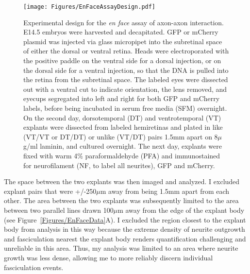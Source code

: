 \begin{figure}[hbtp]
    \begin{center}
        \texttt{[image: Figures/EnFaceAssayDesign.pdf]}
        \caption[Experimental design for the \emph{en face} assay of axon-axon interaction.]
        {Experimental design for the \emph{en face} assay of axon-axon interaction.
        E14.5 embryos were harvested and decapitated.
        GFP or mCherry plasmid was injected via glass micropipet into the subretinal space of either the dorsal or ventral retina.
        Heads were electroporated with the positive paddle on the ventral side for a dorsal injection, or on the dorsal side for a ventral injection, so that the DNA is pulled into the retina from the subretinal space.
        The labeled eyes were dissected out with a ventral cut to indicate orientation, the lens removed, and eyecups segregated into left and right for both GFP and mCherry labels, before being incubated in serum free media (SFM) overnight.
        On the second day, dorsotemporal (DT) and ventrotemporal (VT) explants were dissected from labeled hemiretinas and plated in like (VT/VT or DT/DT) or unlike (VT/DT) pairs 1.5mm apart on 8$\mu$g/ml laminin, and cultured overnight.
        The next day, explants were fixed with warm 4\% paraformaldehyde (PFA) and immunostained for neurofilament (NF, to label all neurites), GFP and mCherry.
        }
        \label{Figures/EnFaceAssayDesign}
    \end{center}
\end{figure}
The space between the two explants was then imaged and analyzed.
I excluded explant pairs that were +/-250$\mu$m away from being 1.5mm apart from each other.
The area between the two explants was subsequently limited to the area between two parallel lines drawn 100$\mu$m away from the edge of the explant body (see Figure~\ref{Figures/EnFaceData}A).
I excluded the region closest to the explant body from analysis in this way because the extreme density of neurite outgrowth and fasciculation nearest the explant body renders quantification challenging and unreliable in this area.
Thus, my analysis was limited to an area where neurite growth was less dense, allowing me to more reliably discern individual fasciculation events.

